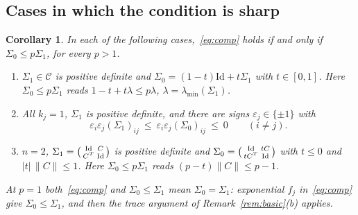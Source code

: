\documentclass[11pt]{amsart}
\newtheorem{corollary}[theorem]{Corollary}
\theoremstyle{definition}
\newcommand{\Id}{\mathrm{Id}}
\begin{document}
\subsection{Cases in which the condition is sharp}
\begin{corollary}\label{cor:sharp}
In each of the following cases,~\eqref{eq:comp} holds if and only if $\Sigma_0\le p\Sigma_1$, for every $p>1$.
\begin{enumerate}[label=(\alph*)]
\item $\Sigma_1\in\mathcal C$ is positive definite and $\Sigma_0=(1-t)\Id+t\Sigma_1$ with $t\in[0,1]$. Here
$\Sigma_0\le p\Sigma_1$ reads $1-t+t\lambda\le p\lambda$, $\lambda=\lambda_{\min}(\Sigma_1)$.
\item All $k_j=1$, $\Sigma_1$ is positive definite, and there are signs $\varepsilon_j\in\{\pm1\}$ with
\begin{equation}\label{eq:signs}
\varepsilon_i\varepsilon_j(\Sigma_1)_{ij}\ \le\ \varepsilon_i\varepsilon_j(\Sigma_0)_{ij}\ \le\ 0\qquad(i\ne j).
\end{equation}
\item $n=2$, $\Sigma_1=\begin{psmallmatrix}\Id&C\\C^T&\Id\end{psmallmatrix}$ is positive definite and
$\Sigma_0=\begin{psmallmatrix}\Id&tC\\tC^T&\Id\end{psmallmatrix}$ with $t\le0$ and $|t|\,\|C\|\le1$. Here
$\Sigma_0\le p\Sigma_1$ reads $(p-t)\|C\|\le p-1$.
\end{enumerate}
At $p=1$ both~\eqref{eq:comp} and $\Sigma_0\le\Sigma_1$ mean $\Sigma_0=\Sigma_1$: exponential $f_j$ in~\eqref{eq:comp}
give $\Sigma_0\le\Sigma_1$, and then the trace argument of Remark~\ref{rem:basic}(b) applies.
\end{corollary}
\end{document}
